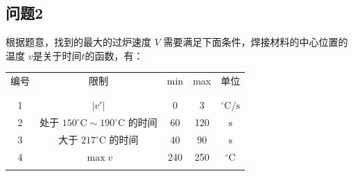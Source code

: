 \documentclass[../main.tex]{subfiles}
\begin{document}
\subsection{问题2}
根据题意，找到的最大的过炉速度 \(V\) 需要满足下面条件，焊接材料的中心位置的温度 \(v\)是关于时间\(t\)的函数，有：

\begin{table}[H]
\centering
\begin{tabular}{ccccc}
编号&限制 & min & max 	& 单位
\\ [-1em]
\\ \hline \hline
\\ [-1em]
1&\(\vert v '\vert\) & 0 & 3 & \(^{\circ}\mathrm{C} / \mathrm{s}\)\\
2&处于 \(150 ^{\circ}\mathrm{C}\sim 190 ^{\circ}\mathrm{C}\) 的时间 & 60 & 120 & \(\mathrm{s}\)\\
3&大于 \(217 ^{\circ}\mathrm{C}\) 的时间 & 40 & 90 & \(\mathrm{s}\)\\
4&\(\max {v}\) & 240 & 250 & \(^{\circ}\mathrm{C}\)
\\ [-1em]
\\ \hline
\end{tabular}
\end{table}
\end{document}

